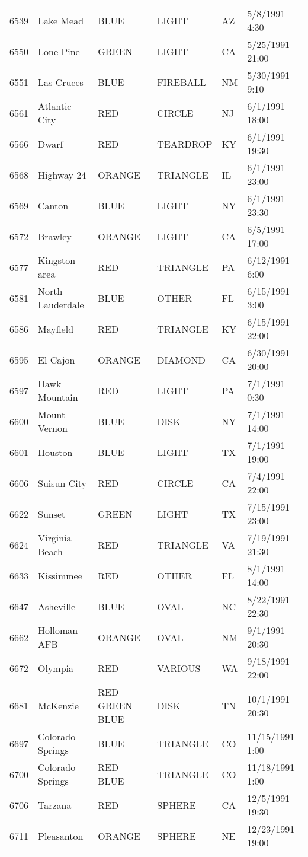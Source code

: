 \begin{tabular}{llllll}
6539 & Lake Mead & BLUE & LIGHT & AZ & 5/8/1991 4:30 \\
6550 & Lone Pine & GREEN & LIGHT & CA & 5/25/1991 21:00 \\
6551 & Las Cruces & BLUE & FIREBALL & NM & 5/30/1991 9:10 \\
6561 & Atlantic City & RED & CIRCLE & NJ & 6/1/1991 18:00 \\
6566 & Dwarf & RED & TEARDROP & KY & 6/1/1991 19:30 \\
6568 & Highway 24 & ORANGE & TRIANGLE & IL & 6/1/1991 23:00 \\
6569 & Canton & BLUE & LIGHT & NY & 6/1/1991 23:30 \\
6572 & Brawley & ORANGE & LIGHT & CA & 6/5/1991 17:00 \\
6577 & Kingston area & RED & TRIANGLE & PA & 6/12/1991 6:00 \\
6581 & North Lauderdale & BLUE & OTHER & FL & 6/15/1991 3:00 \\
6586 & Mayfield & RED & TRIANGLE & KY & 6/15/1991 22:00 \\
6595 & El Cajon & ORANGE & DIAMOND & CA & 6/30/1991 20:00 \\
6597 & Hawk Mountain & RED & LIGHT & PA & 7/1/1991 0:30 \\
6600 & Mount Vernon & BLUE & DISK & NY & 7/1/1991 14:00 \\
6601 & Houston & BLUE & LIGHT & TX & 7/1/1991 19:00 \\
6606 & Suisun City & RED & CIRCLE & CA & 7/4/1991 22:00 \\
6622 & Sunset & GREEN & LIGHT & TX & 7/15/1991 23:00 \\
6624 & Virginia Beach & RED & TRIANGLE & VA & 7/19/1991 21:30 \\
6633 & Kissimmee & RED & OTHER & FL & 8/1/1991 14:00 \\
6647 & Asheville & BLUE & OVAL & NC & 8/22/1991 22:30 \\
6662 & Holloman AFB & ORANGE & OVAL & NM & 9/1/1991 20:30 \\
6672 & Olympia & RED & VARIOUS & WA & 9/18/1991 22:00 \\
6681 & McKenzie & RED GREEN BLUE & DISK & TN & 10/1/1991 20:30 \\
6697 & Colorado Springs & BLUE & TRIANGLE & CO & 11/15/1991 1:00 \\
6700 & Colorado Springs & RED BLUE & TRIANGLE & CO & 11/18/1991 1:00 \\
6706 & Tarzana & RED & SPHERE & CA & 12/5/1991 19:30 \\
6711 & Pleasanton & ORANGE & SPHERE & NE & 12/23/1991 19:00 \\

\end{tabular}
